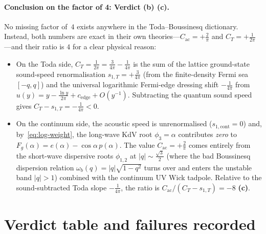 \documentclass[11pt,a4paper]{article}
\newcommand{\claim}[1]{\textbf{(#1)}}
\begin{document}
\paragraph{Conclusion on the factor of 4: Verdict (b) \claim{c}.}
No missing factor of~$4$ exists anywhere in the Toda--Boussinesq dictionary.
Instead, both numbers are exact in their own theories---$C_{\mathrm{ac}} = +\frac{2}{\pi}$ and
$C_T = +\frac{1}{2\pi}$---and their ratio is $4$ for a clear physical reason:
\begin{itemize}
  \item On the Toda side, $C_T = \frac{1}{2\pi} = \frac{3}{4\pi} - \frac{1}{4\pi}$ is the sum of the
  lattice ground-state sound-speed renormalisation $s_{1,T} = +\frac{3}{4\pi}$ (from the finite-density
  Fermi sea $[-q,q]$) and the universal logarithmic Fermi-edge dressing shift $-\frac{1}{4\pi}$
  from $u(y) = y - \frac{\ln y}{2\pi} + c_{\mathrm{edge}} + O(y^{-1})$. Subtracting the quantum sound
  speed gives $C_T - s_{1,T} = -\frac{1}{4\pi} < 0$.
  \item On the continuum side, the acoustic speed is unrenormalised ($s_{1,\mathrm{cont}} = 0$) and,
  by~\eqref{eq:log-weight}, the long-wave KdV root $\phi_3 = \alpha$ contributes \emph{zero} to
  $F_g(\alpha) = e(\alpha) - \cos\alpha\,p(\alpha)$. The value $C_{\mathrm{ac}} = +\frac{2}{\pi}$
  comes entirely from the short-wave dispersive roots $\phi_{1,2}$ at $|q|\sim \frac{\sqrt{3}}{2}$
  (where the bad Boussinesq dispersion relation $\omega_b(q) = |q|\sqrt{1-q^2}$ turns over and enters
  the unstable band $|q|>1$) combined with the continuum UV Wick tadpole. Relative to the
  sound-subtracted Toda slope $-\frac{1}{4\pi}$, the ratio is $C_{\mathrm{ac}}/(C_T - s_{1,T}) = -8$ \claim{c}.
\end{itemize}

\section{Verdict table and failures recorded}
\end{document}
